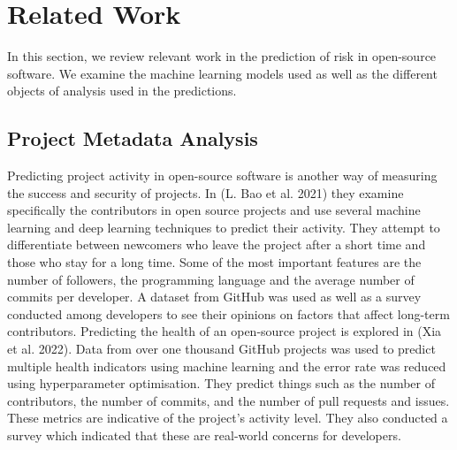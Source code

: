 \documentclass[10pt, compsoc, conference]{IEEEtran}
\begin{document}
\section{Related Work}
In this section, we review relevant work in the prediction of risk in open-source software. We examine the machine learning models used as well as the different objects of analysis used in the predictions.  

\subsection{Project Metadata Analysis}
Predicting project activity in open-source software is another way of measuring the success and security of projects. In (L. Bao et al. 2021) they examine specifically the contributors in open source projects and use several machine learning and deep learning techniques to predict their activity. They attempt to differentiate between newcomers who leave the project after a short time and those who stay for a long time. Some of the most important features are the number of followers, the programming language and the average number of commits per developer. A dataset from GitHub was used as well as a survey conducted among developers to see their opinions on factors that affect long-term contributors. Predicting the health of an open-source project is explored in (Xia et al. 2022). Data from over one thousand GitHub projects was used to predict multiple health indicators using machine learning and the error rate was reduced using hyperparameter optimisation. They predict things such as the number of contributors, the number of commits, and the number of pull requests and issues. These metrics are indicative of the project’s activity level. They also conducted a survey which indicated that these are real-world concerns for developers. 
\end{document}
